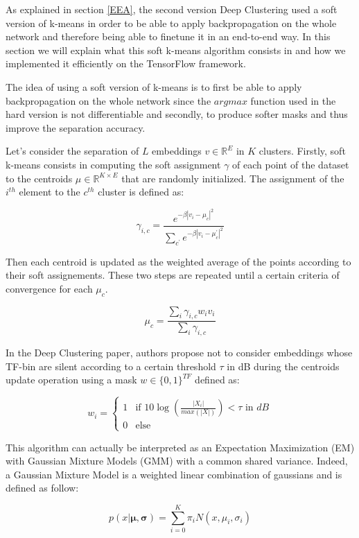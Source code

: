 \documentclass[master, tikz, final,11pt, dvipdfmx]{iscs-thesis}
\begin{document}
As explained in section \ref{EEA}, the second version Deep Clustering used a soft version of k-means in order to be able to apply backpropagation on the whole network and therefore being able to finetune it in an end-to-end way. In this section we will explain what this soft k-means algorithm consists in and how we implemented it efficiently on the TensorFlow framework.

The idea of using a soft version of k-means is to first be able to apply backpropagation on the whole network since the $argmax$ function used in the hard version is not differentiable and secondly, to produce softer masks and thus improve the separation accuracy. 

Let's consider the separation of $L$ embeddings $v \in \mathbb{R}^E$ in $K$ clusters. Firstly, soft k-means consists in computing the soft assignment $\gamma$ of each point of the dataset to the centroids $\mu \in \mathbb{R}^{K\times E}$ that are randomly initialized. The assignment of the $i^{th}$ element to the $c^{th}$ cluster is defined as:

\[ \gamma_{i,c} = \frac{e^{-\beta |v_i-\mu_c|^2}}{\sum_{c^\prime} e^{-\beta |v_i-\mu_c^\prime|^2}}  \]

Then each centroid is updated as the weighted average of the points according to their soft assignements. These two steps are repeated until a certain criteria of convergence for each $\mu_c$.

\[ \mu_c = \frac{\sum_i \gamma_{i,c}w_iv_i}{\sum_i \gamma_{i,c}}  \]

In the Deep Clustering paper, authors propose not to consider embeddings whose TF-bin are silent according to a certain threshold $\tau$ in dB during the centroids update operation using a mask $w \in {\{0,1\}}^{TF}$ defined as:

$$
w_i =  \left\{
    \begin{array}{ll}
        1 & \mbox{if } 10\log (\frac{|X_i|}{max(|X|)}) < \tau \mbox{ in } dB  \\
        0 & \mbox{else}
    \end{array}
\right.
$$

This algorithm can actually be interpreted as an Expectation Maximization (EM) with Gaussian Mixture Models (GMM) with a common shared variance. Indeed, a Gaussian Mixture Model is a weighted linear combination of gaussians and is defined as follow:

\[
 p(x | \mathbf{\mu}, \mathbf{\sigma}) = \sum_{i=0}^K \pi_i N(x, \mu_i,\sigma_i)
\]
\end{document}
